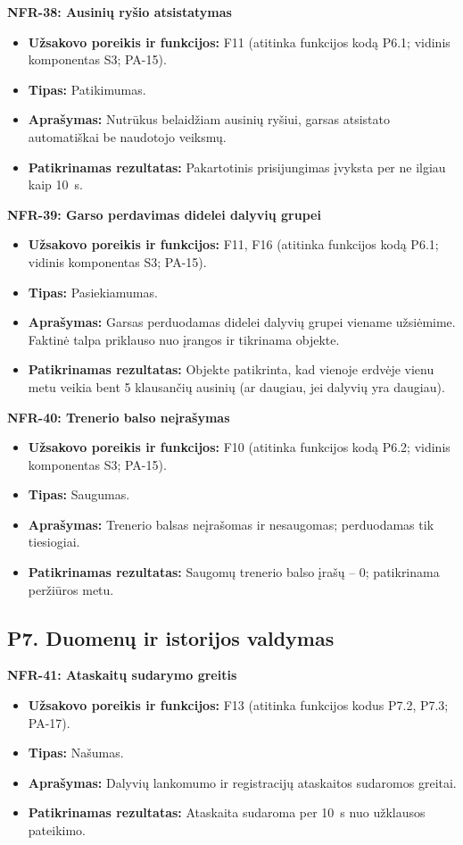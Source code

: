 \noindent\textbf{NFR-38: Ausinių ryšio atsistatymas}
\begin{itemize}
    \item \textbf{Užsakovo poreikis ir funkcijos:} F11 (atitinka funkcijos kodą P6.1; vidinis komponentas S3; PA-15).
    \item \textbf{Tipas:} Patikimumas.
    \item \textbf{Aprašymas:} Nutrūkus belaidžiam ausinių ryšiui, garsas atsistato automatiškai be naudotojo veiksmų.
    \item \textbf{Patikrinamas rezultatas:} Pakartotinis prisijungimas įvyksta per ne ilgiau kaip 10~s.
\end{itemize}

\noindent\textbf{NFR-39: Garso perdavimas didelei dalyvių grupei}
\begin{itemize}
    \item \textbf{Užsakovo poreikis ir funkcijos:} F11, F16 (atitinka funkcijos kodą P6.1; vidinis komponentas S3; PA-15).
    \item \textbf{Tipas:} Pasiekiamumas.
    \item \textbf{Aprašymas:} Garsas perduodamas didelei dalyvių grupei viename užsiėmime. Faktinė talpa priklauso nuo įrangos ir tikrinama objekte.
    \item \textbf{Patikrinamas rezultatas:} Objekte patikrinta, kad vienoje erdvėje vienu metu veikia bent 5 klausančių ausinių (ar daugiau, jei dalyvių yra daugiau).
\end{itemize}

\noindent\textbf{NFR-40: Trenerio balso neįrašymas}
\begin{itemize}
    \item \textbf{Užsakovo poreikis ir funkcijos:} F10 (atitinka funkcijos kodą P6.2; vidinis komponentas S3; PA-15).
    \item \textbf{Tipas:} Saugumas.
    \item \textbf{Aprašymas:} Trenerio balsas neįrašomas ir nesaugomas; perduodamas tik tiesiogiai.
    \item \textbf{Patikrinamas rezultatas:} Saugomų trenerio balso įrašų -- 0; patikrinama peržiūros metu.
\end{itemize}

\subsection{P7. Duomenų ir istorijos valdymas}

\noindent\textbf{NFR-41: Ataskaitų sudarymo greitis}
\begin{itemize}
    \item \textbf{Užsakovo poreikis ir funkcijos:} F13 (atitinka funkcijos kodus P7.2, P7.3; PA-17).
    \item \textbf{Tipas:} Našumas.
    \item \textbf{Aprašymas:} Dalyvių lankomumo ir registracijų ataskaitos sudaromos greitai.
    \item \textbf{Patikrinamas rezultatas:} Ataskaita sudaroma per 10~s nuo užklausos pateikimo.
\end{itemize}

